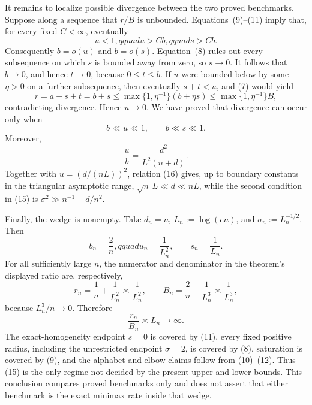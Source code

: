 It remains to localize possible divergence between the two proved benchmarks.  Suppose along a sequence that \(r/B\) is unbounded.  Equations~(9)--(11) imply that, for every fixed \(C<\infty\), eventually
\[
 u<1,qquad u>Cb,qquad s>Cb.
\tag{13}
\]
Consequently \(b=o(u)\) and \(b=o(s)\).  Equation~(8) rules out every subsequence on which \(s\) is bounded away from zero, so \(s\to0\).  It follows that \(b\to0\), and hence \(t\to0\), because \(0\le t\le b\).  If \(u\) were bounded below by some \(\eta>0\) on a further subsequence, then eventually \(s+t<u\), and (7) would yield
\[
 r=a+s+t=b+s
 \le \max\{1,\eta^{-1}\}(b+\eta s)
 \le \max\{1,\eta^{-1}\}B,
\tag{14}
\]
contradicting divergence.  Hence \(u\to0\).  We have proved that divergence can occur only when
\[
 b\ll u\ll1,
 \qquad b\ll s\ll1.
\tag{15}
\]
Moreover,
\[
 \frac ub=\frac{d^2}{L^2(n+d)}.
\tag{16}
\]
Together with \(u=(d/(nL))^2\), relation (16) gives, up to boundary constants in the triangular asymptotic range, \(\sqrt n\,L\ll d\ll nL\), while the second condition in (15) is \(\sigma^2\gg n^{-1}+d/n^2\).

Finally, the wedge is nonempty.  Take \(d_n=n\), \(L_n:=\log(en)\), and \(\sigma_n:=L_n^{-1/2}\).  Then
\[
 b_n=\frac2n,qquad u_n=\frac1{L_n^2},
 \qquad s_n=\frac1{L_n}.
\tag{17}
\]
For all sufficiently large \(n\), the numerator and denominator in the theorem's displayed ratio are, respectively,
\[
 r_n=\frac1n+\frac1{L_n^2}\asymp\frac1{L_n^2},
 \qquad
 B_n=\frac2n+\frac1{L_n^3}\asymp\frac1{L_n^3},
\tag{18}
\]
because \(L_n^3/n\to0\).  Therefore
\[
 \frac{r_n}{B_n}\asymp L_n\longrightarrow\infty.
\tag{19}
\]
The exact-homogeneity endpoint \(s=0\) is covered by (11), every fixed positive radius, including the unrestricted endpoint \(\sigma=2\), is covered by (8), saturation is covered by (9), and the alphabet and elbow claims follow from (10)--(12).  Thus (15) is the only regime not decided by the present upper and lower bounds.  This conclusion compares proved benchmarks only and does not assert that either benchmark is the exact minimax rate inside that wedge.